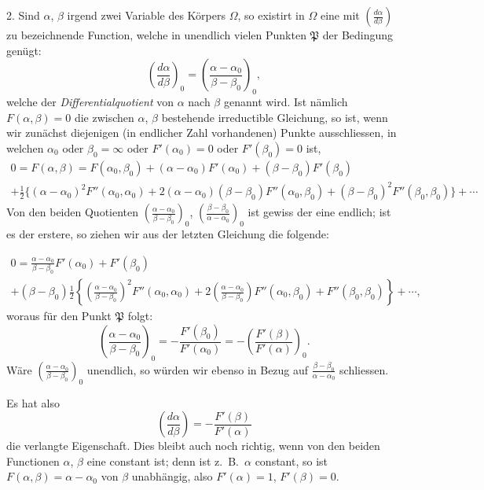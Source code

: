 \documentclass{article}
\begin{document}
2. Sind $\alpha$, $\beta$ irgend zwei Variable des Körpers $\Omega$, so existirt in $\Omega$ eine mit $\left(\frac{d\alpha}{d\beta}\right)$ zu bezeichnende Function, welche in unendlich vielen Punkten $\mathfrak{P}$ der Bedingung genügt:
\[ \left(\frac{d\alpha}{d\beta}\right)_{0} = \left(\frac{\alpha-\alpha_{0}}{\beta-\beta_{0}}\right)_{0}, \]
welche der \emph{Differentialquotient} von $\alpha$ nach $\beta$ genannt wird. Ist nämlich $F(\alpha, \beta) = 0$ die zwischen $\alpha$, $\beta$ bestehende irreductible Gleichung, so ist, wenn wir zunächst diejenigen (in endlicher Zahl vorhandenen) Punkte ausschliessen, in welchen $\alpha_{0}$ oder $\beta_{0} = \infty$ oder $F'(\alpha_{0}) = 0$ oder $F'(\beta_{0}) = 0$ ist,
\[ \begin{gathered} 0 = F(\alpha, \beta) = F(\alpha_{0}, \beta_{0}) + (\alpha-\alpha_{0})F'(\alpha_{0}) + (\beta-\beta_{0})F'(\beta_{0}) \\ + \frac{1}{2}\{(\alpha-\alpha_{0})^{2}F''(\alpha_{0}, \alpha_{0}) + 2(\alpha-\alpha_{0})(\beta-\beta_{0})F''(\alpha_{0}, \beta_{0}) + (\beta-\beta_{0})^{2}F''(\beta_{0}, \beta_{0})\} + \cdots \end{gathered} \]
Von den beiden Quotienten $\left(\frac{\alpha-\alpha_{0}}{\beta-\beta_{0}}\right)_{0}$, $\left(\frac{\beta-\beta_{0}}{\alpha-\alpha_{0}}\right)_{0}$ ist gewiss der eine endlich; ist es der erstere, so ziehen wir aus der letzten Gleichung die folgende:

\[ \begin{gathered} 0 = \frac{\alpha-\alpha_{0}}{\beta-\beta_{0}}F'(\alpha_{0}) + F'(\beta_{0}) \\ + (\beta-\beta_{0})\frac{1}{2}\left\{\left(\frac{\alpha-\alpha_{0}}{\beta-\beta_{0}}\right)^{2}F''(\alpha_{0}, \alpha_{0}) + 2\left(\frac{\alpha-\alpha_{0}}{\beta-\beta_{0}}\right)F''(\alpha_{0}, \beta_{0}) + F''(\beta_{0}, \beta_{0})\right\} + \cdots, \end{gathered} \]
woraus für den Punkt $\mathfrak{P}$ folgt:
\[ \left(\frac{\alpha-\alpha_{0}}{\beta-\beta_{0}}\right)_{0} = -\frac{F'(\beta_{0})}{F'(\alpha_{0})} = -\left(\frac{F'(\beta)}{F'(\alpha)}\right)_{0}. \]
Wäre $\left(\frac{\alpha-\alpha_{0}}{\beta-\beta_{0}}\right)_{0}$ unendlich, so würden wir ebenso in Bezug auf $\frac{\beta-\beta_{0}}{\alpha-\alpha_{0}}$ schliessen.

Es hat also
\[ \left(\frac{d\alpha}{d\beta}\right) = -\frac{F'(\beta)}{F'(\alpha)} \tag{1.} \]
die verlangte Eigenschaft. Dies bleibt auch noch richtig, wenn von den beiden Functionen $\alpha$, $\beta$ eine constant ist; denn ist z.\ B.\ $\alpha$ constant, so ist $F(\alpha, \beta) = \alpha - \alpha_{0}$ von $\beta$ unabhängig, also $F'(\alpha) = 1$, $F'(\beta) = 0$.
\end{document}
